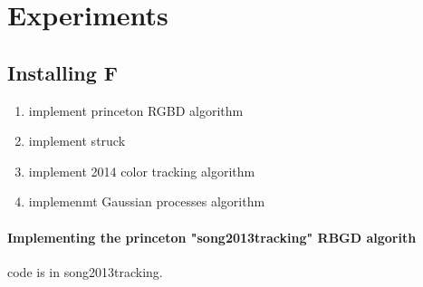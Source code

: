 \chapter{Experiments}
\label{ch:experiments}


\section{Installing F}

\begin{enumerate}
	\item implement princeton RGBD algorithm
	\item implement struck
	\item implement 2014 color tracking algorithm
	\item implemenmt Gaussian processes algorithm
\end{enumerate}

\subsubsection{Implementing the princeton "song2013tracking" RBGD algorith}

code is in song2013tracking. 
